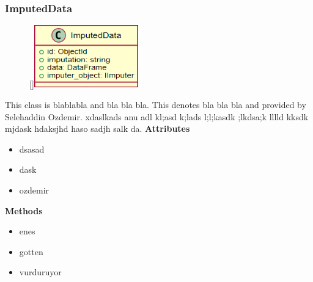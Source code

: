 \subsubsection{ImputedData}
\begin{figure}
    \raisebox{0pt}[\dimexpr{}\baselineskip\relax]{\includegraphics[width=4.5cm]{classes/model-management/16.png}}
\end{figure} 
\par
This class is blablabla and bla bla bla. This denotes bla bla bla and provided by Selehaddin Ozdemir. xdaslkads anu adl kl;asd k;lads l;l;kasdk ;lkdsa;k lllld kksdk mjdask hdaksjhd haso sadjh salk da.
\newline
\newline
\textbf{Attributes}
\begin{itemize}
    \item dsasad
    \item dask
    \item ozdemir
\end{itemize}
\textbf{Methods}
\begin{itemize}
    \item enes
    \item gotten
    \item vurduruyor
\end{itemize}

